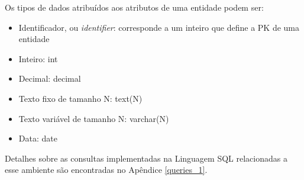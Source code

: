 Os tipos de dados atribuídos aos atributos de uma entidade podem ser:

\begin{itemize}
    \item Identificador, ou \textit{identifier}: corresponde a um inteiro que define a PK de uma entidade
    \item Inteiro: int
    \item Decimal: decimal
    \item Texto fixo de tamanho N: text(N)
    \item Texto variável de tamanho N: varchar(N)
    \item Data: date
    
\end{itemize}

Detalhes sobre as consultas implementadas na Linguagem SQL relacionadas a esse ambiente são encontradas no Apêndice \ref{queries_1}.

